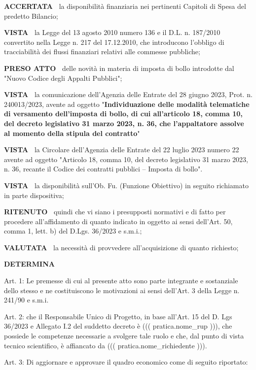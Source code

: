 \textbf{ACCERTATA~}	la disponibilità finanziaria nei pertinenti
Capitoli di Spesa del predetto Bilancio;

\textbf{VISTA~}	la Legge del 13 agosto 2010 numero 136	e il
D.L. n. 187/2010 convertito nella Legge n. 217 del 17.12.2010, che
introducono l'obbligo di tracciabilità dei flussi finanziari relativi
alle commesse pubbliche;

\textbf{PRESO ATTO~} delle novità in materia di imposta di bollo introdotte dal "Nuovo Codice degli Appalti Pubblici";

\textbf{VISTA~}	la comunicazione dell'Agenzia delle Entrate del 28
giugno 2023,  Prot. n. 240013/2023,  avente ad oggetto	"\textbf{Individuazione
delle modalità telematiche di versamento dell'imposta di bollo, di cui
all'articolo 18, comma 10, del decreto legislativo 31 marzo 2023, n. 36,
che l'appaltatore assolve al momento della stipula del contratto}"

\textbf{VISTA~}	la Circolare dell'Agenzia delle Entrate del 22 luglio
2023 numero 22 avente ad oggetto "Articolo 18, comma 10, del decreto
legislativo 31 marzo 2023, n. 36, recante il Codice dei contratti pubblici
– Imposta di bollo".

\textbf{VISTA~}	la disponibilità sull'Ob. Fu. (Funzione Obiettivo)
in seguito richiamato in parte dispositiva;

\textbf{RITENUTO~} quindi che vi siano i presupposti normativi e
di fatto per procedere all'affidamento di quanto indicato in oggetto
ai sensi dell'Art. 50, comma 1, lett. b) del D.Lgs. 36/2023 e s.m.i.;

\textbf{VALUTATA~} la necessità di provvedere all'acquisizione
di quanto richiesto;

\begin{center}
	\textbf{DETERMINA}
\end{center}

Art. 1: Le premesse di cui al presente atto sono parte integrante e
sostanziale dello stesso e ne costituiscono le motivazioni ai sensi
dell'Art. 3 della Legge n. 241/90 e s.m.i.

Art. 2: che il Responsabile Unico di Progetto, in base all'Art. 15 del
D. Lgs 36/2023 e Allegato I.2 del suddetto decreto è ((( pratica.nome_rup ))),
che possiede le competenze necessarie a svolgere tale ruolo
e che, dal punto di vista tecnico scientifico, è affiancato da
((( pratica.nome_richiedente ))).

Art. 3: Di aggiornare e approvare il quadro economico come di seguito riportato:

